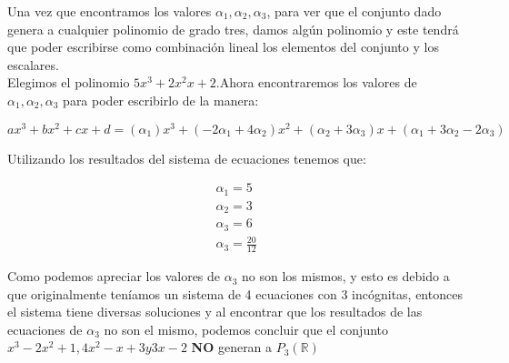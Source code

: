 \documentclass[letterpaper]{article}
\newcommand{\R}{\mathds{R}}
\renewcommand{\*}{\cdot}
\theoremstyle{definition}
\begin{document}
Una vez que encontramos los valores $\alpha_{1}, \alpha_{2}, \alpha_{3}$, para ver que el conjunto dado genera a cualquier polinomio de grado tres, damos algún polinomio y este tendrá que poder escribirse como combinación lineal los elementos del conjunto y los escalares.\\

Elegimos el polinomio $5x^3+2x^2x+2$.Ahora encontraremos los valores de $\alpha_{1}, \alpha_{2}, \alpha_{3}$ para poder escribirlo de la manera:
\begin{center}
	$ax^3+bx^2+cx+d = (\alpha_{1})x^3 + (-2\alpha_{1}+4\alpha_{2})x^2 + (\alpha_{2}+3\alpha_{3})x + (\alpha_{1}+3\alpha_{2}-2\alpha_{3})$
\end{center} 
Utilizando los resultados del sistema de ecuaciones tenemos que:
\begin{center}
\begin{align*}
\alpha_{1}=5\\
\alpha_{2}=3\\
\alpha_{3}=6\\
\alpha_{3}=\frac{20}{12}
\end{align*}
\end{center}

Como podemos apreciar los valores de $\alpha_{3}$ no son los mismos, y esto es debido a que originalmente teníamos un sistema de 4 ecuaciones con 3 incógnitas, entonces el sistema tiene diversas soluciones y al encontrar que los resultados de las ecuaciones de $\alpha_{3}$ no son el mismo, podemos concluir que el conjunto $x^3-2x^2+1,4x^2-x+3 y 3x-2$  \textbf{NO} generan a $P_{3}(\R)$
\end{document}
